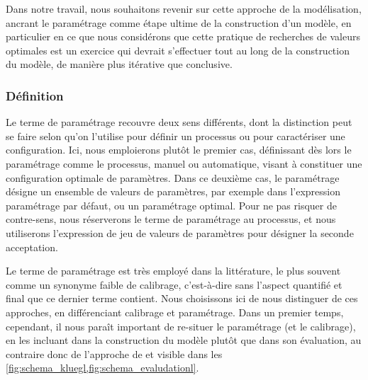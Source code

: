Dans notre travail, nous souhaitons revenir sur cette approche de la modélisation, ancrant le paramétrage comme étape ultime de la construction d'un modèle, en particulier en ce que nous considérons que cette pratique de recherches de valeurs optimales est un exercice qui devrait s'effectuer tout au long de la construction du modèle, de manière plus itérative que conclusive.

\subsubsection{Définition \label{sssec:definition-parametrage}}

Le terme de paramétrage recouvre deux sens différents, dont la distinction peut se faire selon qu'on l'utilise pour définir un processus ou pour caractériser une configuration.
Ici, nous emploierons plutôt le premier cas, définissant dès lors le paramétrage comme le processus, manuel ou automatique, visant à constituer une configuration optimale de paramètres.
Dans ce deuxième cas, le paramétrage désigne un ensemble de valeurs de paramètres, par exemple dans l'expression \og paramétrage par défaut\fg{}, ou un paramétrage optimal.
Pour ne pas risquer de contre-sens, nous réserverons le terme de paramétrage au processus, et nous utiliserons l'expression de \og jeu de valeurs de paramètres\fg{} pour désigner la seconde acceptation.

Le terme de paramétrage est très employé dans la littérature, le plus souvent comme un synonyme \og faible\fg{} de calibrage, c'est-à-dire sans l'aspect quantifié et \og final\fg{} que ce dernier terme contient.
Nous choisissons ici de nous distinguer de ces approches, en différenciant calibrage et paramétrage.
Dans un premier temps, cependant, il nous paraît important de re-situer le paramétrage (et le calibrage), en les incluant dans la construction du modèle plutôt que dans son évaluation, au contraire donc de l'approche de  \textcite{klugl_validation_2008} et \textcite{ngo_calibration_2012} visible dans les \cref{fig:schema_kluegl,fig:schema_evaludationl}.

